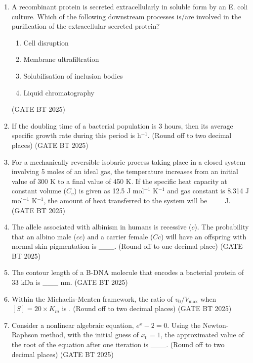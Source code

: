 \documentclass[journal,12pt,onecolumn]{IEEEtran}
\theoremstyle{remark}
\begin{document}
\begin{enumerate}
\item A recombinant protein is secreted extracellularly in soluble form by an E. coli culture. Which of the following downstream processes is/are involved in the purification of the extracellular secreted protein?  
\begin{multicols}{2}
\begin{enumerate}
    \item Cell disruption
    \item Membrane ultrafiltration
    \item Solubilisation of inclusion bodies
    \item Liquid chromatography
\end{enumerate}  
\end{multicols}
\hfill (GATE BT 2025)

\item If the doubling time of a bacterial population is 3 hours, then its average specific growth rate during this period is h$^{-1}$.  
(Round off to two decimal places)  
\hfill (GATE BT 2025)

\item For a mechanically reversible isobaric process taking place in a closed system involving 5 moles of an ideal gas, the temperature increases from an initial value of 300 K to a final value of 450 K. If the specific heat capacity at constant volume ($C_v$) is given as 12.5 J mol$^{-1}$ K$^{-1}$ and gas constant is 8.314 J mol$^{-1}$ K$^{-1}$, the amount of heat transferred to the system will be \_\_\_J.  
\hfill (GATE BT 2025)

\item The allele associated with albinism in humans is recessive ($c$). The probability that an albino male ($cc$) and a carrier female ($Cc$) will have an offspring with normal skin pigmentation is \_\_\_.  
(Round off to one decimal place)  
\hfill (GATE BT 2025)

\item The contour length of a B-DNA molecule that encodes a bacterial protein of 33 kDa is \_\_\_ nm.  
\hfill (GATE BT 2025)

\item Within the Michaelis-Menten framework, the ratio of $v_0 / V_{\max}$ when $[S] = 20 \times K_m$ is .  
(Round off to two decimal places)  
\hfill (GATE BT 2025)

\item Consider a nonlinear algebraic equation, $e^x - 2 = 0$. Using the Newton-Raphson method, with the initial guess of $x_0 = 1$, the approximated value of the root of the equation after one iteration is \_\_\_.  
(Round off to two decimal places)  
\hfill (GATE BT 2025)


\end{enumerate}
\end{document}
